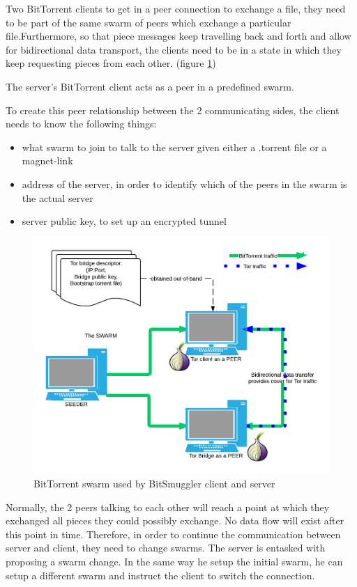 \documentclass[11pt]{book} %
\newcommand{\projectName}{BitSmuggler }
\begin{document}
Two BitTorrent clients to get in a peer connection to exchange a file, they need to be part of the same swarm of peers which exchange a particular file.Furthermore, so that piece messages keep travelling back and forth and allow for bidirectional data transport, the clients need to be in a state in which they keep requesting pieces from each other. (figure \ref{fig:torSwarm})

The server's BitTorrent client acts as a peer in a predefined swarm.

To create this peer relationship between the 2 communicating sides,  the client needs to know the following things:
\begin{itemize}
\item what swarm to join to talk to the server given either a .torrent file or a magnet-link
\item address of the server, in order to identify which of the peers in the swarm is the actual server
\item server public key, to set up an encrypted tunnel
\end{itemize}


\begin{figure}[h!]
\begin{center}
\includegraphics[scale=0.4]{torswarm}
\end{center}
 \caption{BitTorrent swarm used by \projectName client and server}
 \label{fig:torSwarm}
 \end{figure}

Normally, the 2 peers talking to each other will reach a point at which they exchanged all pieces they could possibly exchange. No data flow will exist after this point in time. Therefore, in order to continue the communication between server and client, they need to change swarms. The server is entasked with proposing a swarm change. In the same way he setup the initial swarm, he can setup a different swarm and instruct the client to switch the connection.
\end{document}
